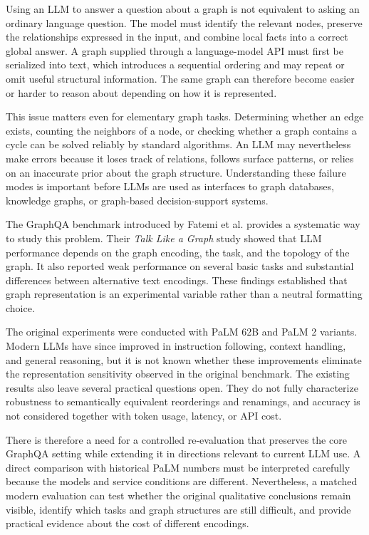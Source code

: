 \documentclass[11pt,a4paper]{article}
\begin{document}
Using an LLM to answer a question about a graph is not equivalent to asking an ordinary language question. The model must identify the relevant nodes, preserve the relationships expressed in the input, and combine local facts into a correct global answer. A graph supplied through a language-model API must first be serialized into text, which introduces a sequential ordering and may repeat or omit useful structural information. The same graph can therefore become easier or harder to reason about depending on how it is represented.

This issue matters even for elementary graph tasks. Determining whether an edge exists, counting the neighbors of a node, or checking whether a graph contains a cycle can be solved reliably by standard algorithms. An LLM may nevertheless make errors because it loses track of relations, follows surface patterns, or relies on an inaccurate prior about the graph structure. Understanding these failure modes is important before LLMs are used as interfaces to graph databases, knowledge graphs, or graph-based decision-support systems.

The GraphQA benchmark introduced by Fatemi et al. provides a systematic way to study this problem. Their \emph{Talk Like a Graph} study showed that LLM performance depends on the graph encoding, the task, and the topology of the graph. It also reported weak performance on several basic tasks and substantial differences between alternative text encodings. These findings established that graph representation is an experimental variable rather than a neutral formatting choice.

The original experiments were conducted with PaLM 62B and PaLM 2 variants. Modern LLMs have since improved in instruction following, context handling, and general reasoning, but it is not known whether these improvements eliminate the representation sensitivity observed in the original benchmark. The existing results also leave several practical questions open. They do not fully characterize robustness to semantically equivalent reorderings and renamings, and accuracy is not considered together with token usage, latency, or API cost.

There is therefore a need for a controlled re-evaluation that preserves the core GraphQA setting while extending it in directions relevant to current LLM use. A direct comparison with historical PaLM numbers must be interpreted carefully because the models and service conditions are different. Nevertheless, a matched modern evaluation can test whether the original qualitative conclusions remain visible, identify which tasks and graph structures are still difficult, and provide practical evidence about the cost of different encodings.
\end{document}
